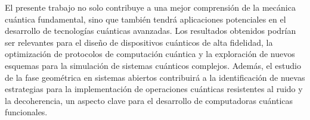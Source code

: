 El presente trabajo no solo contribuye a una mejor comprensión de la mecánica cuántica fundamental, sino que también tendrá aplicaciones potenciales en el desarrollo de tecnologías cuánticas avanzadas. Los resultados obtenidos podrían ser relevantes para el diseño de dispositivos cuánticos de alta fidelidad, la optimización de protocolos de computación cuántica y la exploración de nuevos esquemas para la simulación de sistemas cuánticos complejos. Además, el estudio de la fase geométrica en sistemas abiertos contribuirá a la identificación de nuevas estrategias para la implementación de operaciones cuánticas resistentes al ruido y la decoherencia, un aspecto clave para el desarrollo de computadoras cuánticas funcionales.
